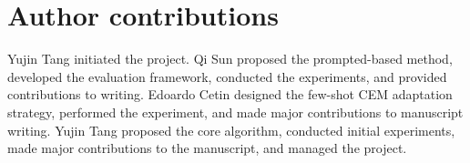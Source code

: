 \ificlrfinal

\section{Author contributions}

Yujin Tang initiated the project.
Qi Sun proposed the prompted-based method, developed the evaluation framework, conducted the experiments, and provided contributions to writing.
Edoardo Cetin designed the few-shot CEM adaptation strategy, performed the experiment, and made major contributions to manuscript writing.
Yujin Tang proposed the core algorithm, conducted initial experiments, made major contributions to the manuscript, and managed the project.

\fi